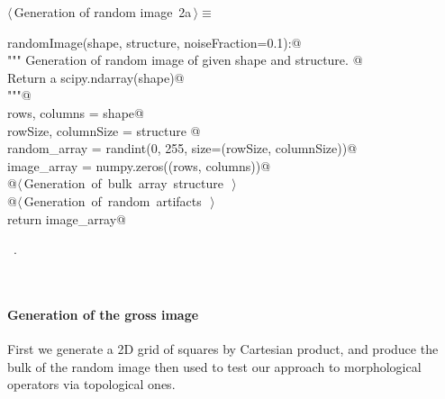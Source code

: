 \documentclass[11pt,oneside]{article}	%
\begin{document}
\begin{flushleft} \small
\begin{minipage}{\linewidth} \label{scrap1}
\protect{}$\langle\,$Generation of random image\nobreak\ {\footnotesize 2a}$\,\rangle\equiv$
\vspace{-1ex}
\begin{list}{}{} \item
\mbox{}\verb@def randomImage(shape, structure, noiseFraction=0.1):@\\
\mbox{}\verb@   """ Generation of random image of given shape and structure. @\\
\mbox{}\verb@      Return a scipy.ndarray(shape)@\\
\mbox{}\verb@   """@\\
\mbox{}\verb@   rows, columns = shape@\\
\mbox{}\verb@   rowSize, columnSize = structure                 @\\
\mbox{}\verb@   random_array = randint(0, 255, size=(rowSize, columnSize))@\\
\mbox{}\verb@   image_array = numpy.zeros((rows, columns))@\\
\mbox{}\verb@   @\hbox{$\langle\,$Generation of bulk array structure\nobreak\ {\footnotesize {}}$\,\rangle$}\verb@@\\
\mbox{}\verb@   @\hbox{$\langle\,$Generation of random artifacts\nobreak\ {\footnotesize {}}$\,\rangle$}\verb@@\\
\mbox{}\verb@   return image_array@\\
\mbox{}\verb@@{\NWsep}
\end{list}
\vspace{-1ex}
\footnotesize\addtolength{\baselineskip}{-1ex}
\begin{list}{}{\setlength{\itemsep}{-\parsep}\setlength{\itemindent}{-\leftmargin}}
\item \NWtxtMacroRefIn\ .
\end{list}
\end{minipage}\\[4ex]
\end{flushleft}


\paragraph{Generation of the gross image}
First we generate a 2D grid of squares by Cartesian product, and produce the bulk of the random image then used to test our approach to morphological operators via topological ones.
\end{document}
